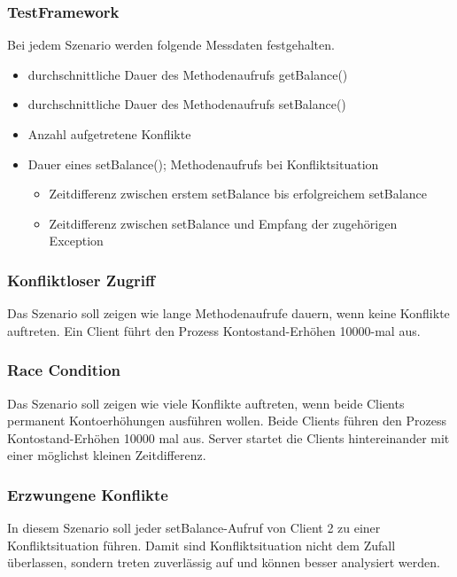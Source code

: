 \documentclass{article}
\begin{document}
\subsubsection{TestFramework}
\label{sec:testframework-1}


Bei jedem Szenario werden folgende Messdaten festgehalten.
\begin{itemize}
\item durchschnittliche Dauer des Methodenaufrufs getBalance()
\item durchschnittliche Dauer des Methodenaufrufs setBalance()
\item Anzahl aufgetretene Konflikte
\item Dauer eines setBalance(); Methodenaufrufs bei Konfliktsituation
  \begin{itemize}
  \item Zeitdifferenz zwischen erstem setBalance bis erfolgreichem setBalance
  \item Zeitdifferenz zwischen setBalance und Empfang der zugehörigen Exception
  \end{itemize}
\end{itemize}

\subsubsection{Konfliktloser Zugriff}
\label{sec:konfl-zugr}

Das Szenario soll zeigen wie lange Methodenaufrufe dauern, wenn keine Konflikte auftreten. Ein Client führt den Prozess Kontostand-Erhöhen 10000-mal aus.

\subsubsection{Race Condition}
\label{sec:race-condition}
Das Szenario soll zeigen wie viele Konflikte auftreten, wenn beide Clients permanent Kontoerhöhungen ausführen wollen.
Beide Clients führen den Prozess Kontostand-Erhöhen 10000 mal aus. Server startet die Clients hintereinander mit einer möglichst kleinen Zeitdifferenz.

\subsubsection{Erzwungene Konflikte}
\label{sec:erzwungene-konflikte}

In diesem Szenario soll jeder setBalance-Aufruf von Client 2 zu einer Konfliktsituation führen. Damit sind Konfliktsituation nicht dem Zufall überlassen, sondern treten zuverlässig auf und können besser analysiert werden.
\end{document}

